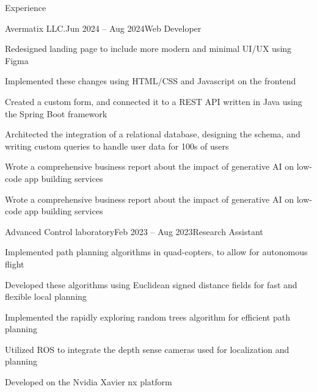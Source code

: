 \begin{rSection}{Experience}

	\begin{rSubsection}{Avermatix LLC.}{Jun 2024 -- Aug 2024}{Web Developer}{}
		\item Redesigned landing page to include more modern and minimal UI/UX using Figma
		\item Implemented these changes using HTML/CSS and Javascript on the frontend
		\item Created a custom form, and connected it to a REST API written in Java using the Spring Boot framework
		\item Architected the integration of a relational database, designing the schema, and writing custom queries to handle user data for 100s of users
		\item Wrote a comprehensive business report about the impact of generative AI on low-code app building services
		\item Wrote a comprehensive business report about the impact of generative AI on low-code app building services
	\end{rSubsection}


	\begin{rSubsection}{Advanced Control laboratory}{Feb 2023 -- Aug 2023}{Research Assistant}{}
		\item Implemented path planning algorithms in quad-copters, to allow for autonomous flight
		\item Developed these algorithms using Euclidean signed distance fields for fast and flexible local planning
		\item Implemented the rapidly exploring random trees algorithm for efficient path planning
		\item Utilized ROS to integrate the depth sense cameras used for localization and planning
		\item Developed on the Nvidia Xavier nx platform
	\end{rSubsection}

\end{rSection}



